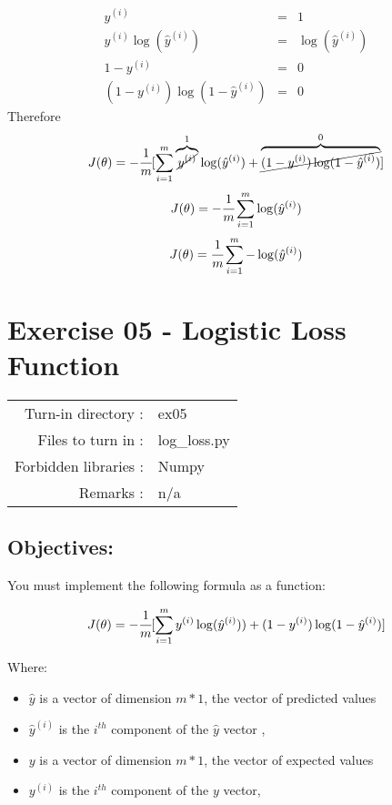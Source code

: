\documentclass[]{article}
\begin{document}
\[
\begin{matrix}
y^{(i)} & = & 1 \\
y^{(i)}\log(\hat{y}^{(i)}) & = & \log(\hat{y}^{(i)})\\
1 - y^{(i)} & = & 0 \\ 
(1 - y^{(i)})\log(1 - \hat{y}^{(i)}) & = & 0  
\end{matrix}
\] \normalsize Therefore \large \[
J( \theta) = -\cfrac{1} {m} \lbrack \sum_{i = 1}^{m} \overbrace{\cancel{y^{(i)}}}^{1}\log(\hat{y}^{(i)}) + \overbrace{\cancel{(1 - y^{(i)})\log(1 - \hat{y}^{(i)})}}^{0}\rbrack
\] \normalsize \large \[
J( \theta) = -\cfrac{1} {m} \sum_{i = 1}^{m} \log(\hat{y}^{(i)})
\] \normalsize \large \[
J( \theta) = \cfrac{1} {m} \sum_{i = 1}^{m} -\log(\hat{y}^{(i)})
\] \normalsize

\clearpage

\hypertarget{exercise-05---logistic-loss-function-1}{%
\section{Exercise 05 - Logistic Loss
Function}\label{exercise-05---logistic-loss-function-1}}

\begin{longtable}[]{@{}rl@{}}
\toprule
\endhead
Turn-in directory : & ex05\tabularnewline
Files to turn in : & log\_loss.py\tabularnewline
Forbidden libraries : & Numpy\tabularnewline
Remarks : & n/a\tabularnewline
\bottomrule
\end{longtable}

\hypertarget{objectives-4}{%
\subsection{Objectives:}\label{objectives-4}}

You must implement the following formula as a function:

\large

\[
J( \theta) = -\cfrac{1} {m} \lbrack \sum_{i = 1}^{m} y^{(i)}\log(\hat{y}^{(i)})) + (1 - y^{(i)})\log(1 - \hat{y}^{(i)})\rbrack
\] \normalsize

Where:

\begin{itemize}
\item
  \(\hat{y}\) is a vector of dimension \(m * 1\), the vector of
  predicted values
\item
  \(\hat{y}^{(i)}\) is the \(i^{th}\) component of the \(\hat{y}\)
  vector ,
\item
  \(y\) is a vector of dimension \(m * 1\), the vector of expected
  values
\item
  \(y^{(i)}\) is the \(i^{th}\) component of the \(y\) vector,
\end{itemize}
\end{document}
